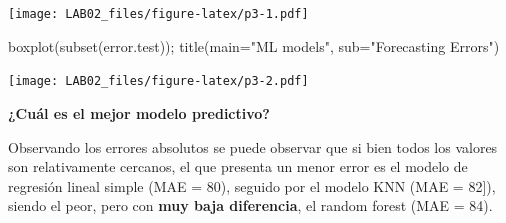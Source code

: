 \documentclass[
]{article}
\newenvironment{Shaded}{\begin{snugshade}}{\end{snugshade}}
\newcommand{\AttributeTok}[1]{\textcolor[rgb]{0.77,0.63,0.00}{#1}}
\newcommand{\FunctionTok}[1]{\textcolor[rgb]{0.00,0.00,0.00}{#1}}
\newcommand{\NormalTok}[1]{#1}
\newcommand{\StringTok}[1]{\textcolor[rgb]{0.31,0.60,0.02}{#1}}
\begin{document}
\texttt{[image: LAB02\_files/figure-latex/p3-1.pdf]}

\begin{Shaded}
\begin{Highlighting}[]
\FunctionTok{boxplot}\NormalTok{(}\FunctionTok{subset}\NormalTok{(error.test)); }\FunctionTok{title}\NormalTok{(}\AttributeTok{main=}\StringTok{"ML models"}\NormalTok{, }\AttributeTok{sub=}\StringTok{"Forecasting Errors"}\NormalTok{)}
\end{Highlighting}
\end{Shaded}

\texttt{[image: LAB02\_files/figure-latex/p3-2.pdf]}

\textbf{¿Cuál es el mejor modelo predictivo?}

Observando los errores absolutos se puede observar que si bien todos los
valores son relativamente cercanos, el que presenta un menor error es el
modelo de regresión lineal simple (MAE = 80), seguido por el modelo KNN
(MAE = 82{]}), siendo el peor, pero con \textbf{muy baja diferencia}, el
random forest (MAE = 84).
\end{document}
